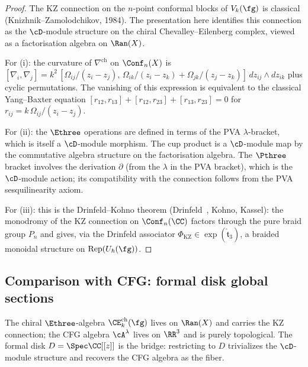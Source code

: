 \begin{proof}
The KZ connection on the $n$-point conformal blocks of
$V_k(\fg)$ is classical (Knizhnik--Zamolodchikov, 1984).
The presentation here identifies this connection as the
$\cD$-module structure on the chiral Chevalley--Eilenberg
complex, viewed as a factorisation algebra on $\Ran(X)$.

For (i): the curvature of $\nabla^{\mathrm{ch}}$ on
$\Conf_n(X)$ is
$[\nabla_i, \nabla_j]
= k^2\,[\Omega_{ij}/(z_i-z_j),\,
\Omega_{ik}/(z_i-z_k) + \Omega_{jk}/(z_j-z_k)]
\,dz_{ij} \wedge dz_{ik}$
plus cyclic permutations. The vanishing of this expression
is equivalent to the classical Yang--Baxter equation
$[r_{12}, r_{13}] + [r_{12}, r_{23}] + [r_{13}, r_{23}] = 0$
for $r_{ij} = k\,\Omega_{ij}/(z_i - z_j)$.

For (ii): the $\Ethree$ operations are defined in terms of
the PVA $\lambda$-bracket, which is itself a $\cD$-module
morphism. The cup product is a $\cD$-module map by the
commutative algebra structure on the factorisation algebra.
The $\Pthree$ bracket involves the derivation $\partial$
(from the $\lambda$ in the PVA bracket), which is the
$\cD$-module action; its compatibility with the connection
follows from the PVA sesquilinearity axiom.

For (iii): this is the Drinfeld--Kohno theorem
(Drinfeld~\cite{EK96}, Kohno, Kassel): the monodromy of the
KZ connection on $\Conf_n(\CC)$ factors through the pure
braid group $P_n$ and gives, via the Drinfeld associator
$\Phi_{\mathrm{KZ}} \in \exp(\hat{\mathfrak{t}}_3)$,
a braided monoidal structure on $\mathrm{Rep}(U_\hbar(\fg))$.
\end{proof}

\subsection{Comparison with CFG: formal disk global sections}
\label{subsec:chiral-e3-cfg-comparison}

The chiral $\Ethree$-algebra
$\CE^{\mathrm{ch}}_k(\fg)$ lives on $\Ran(X)$ and
carries the KZ connection; the CFG algebra $\cA^\lambda$
lives on $\RR^3$ and is purely topological. The formal
disk $D = \Spec \CC[[z]]$ is the bridge: restricting to
$D$ trivializes the $\cD$-module structure and recovers the
CFG algebra as the fiber.

